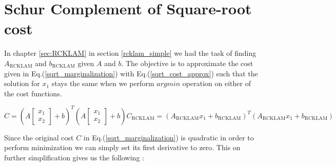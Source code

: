 \chapter{Schur Complement of Square-root cost}\label{sec:schur_sqrt_cost}

In chapter \ref{sec:RCKLAM} in section \ref{rcklam_simple} we had the task of finding $A_\mathrm{RCKLAM}$ and $b_\mathrm{RCKLAM}$ given $A$ and $b$. The objective is to approximate the cost given in Eq.(\ref{sqrt_marginalization}) with Eq.(\ref{sqrt_cost_approx}) such that the solution for $x_1$ stays the same when we perform $argmin$ operation on either of the cost functions.

\begin{subequations}
  \begin{equation}
    C = \left(A\begin{bmatrix}x_1 \\ x_2\end{bmatrix} + b\right)^T\left(A\begin{bmatrix}x_1 \\ x_2\end{bmatrix} + b\right)
    \label{sqrt_marginalization}
  \end{equation}
  \begin{equation}
    C_\mathrm{RCKLAM} = \left(A_\mathrm{RCKLAM}x_1  + b_\mathrm{RCKLAM}\right)^T\left(A_\mathrm{RCKLAM}x_1  + b_\mathrm{RCKLAM}\right)
    \label{sqrt_cost_approx}
  \end{equation}
\end{subequations}

Since the original cost $C$ in Eq.(\ref{sqrt_marginalization}) is quadratic in order to perform minimization we can simply set its first derivative to zero. This on further simplification gives us the following : 

